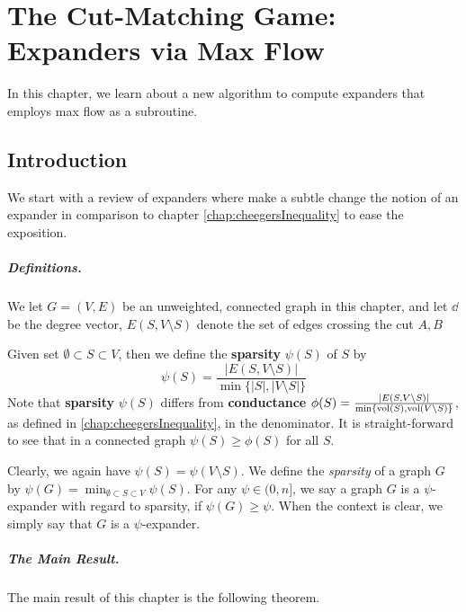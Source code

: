\chapter{The Cut-Matching Game: Expanders via Max Flow}

In this chapter, we learn about a new algorithm to compute expanders that employs max flow as a subroutine.

\section{Introduction}

We start with a review of expanders where make a subtle change the notion of an expander in comparison to chapter \ref{chap:cheegersInequality} to ease the exposition.

\paragraph{Definitions.} We let $G=(V,E)$ be an unweighted, connected graph in this chapter, and let $\dd$ be the degree vector, $E(S,V \setminus S)$ denote the set of edges crossing the cut $A,B$

Given set $\emptyset \subset S \subset V$, then we define the \textbf{sparsity} $\psi(S)$ of $S$ by
\[
\psi(S) = \frac{|E(S, V \setminus S)|}{ \min\{|S|, |V \setminus S| \} } 
\]
Note that \textbf{sparsity} $\psi(S)$ differs from \textbf{conductance} $\phi(S) = \frac{|E(S, V \setminus S)|}{ \min\{\operatorname{vol}(S), \operatorname{vol}(V \setminus S) \} }$, as defined in \ref{chap:cheegersInequality}, in the denominator. It is straight-forward to see that in a connected graph $\psi(S) \geq \phi(S)$ for all $S$. 

Clearly, we again have $\psi(S) = \psi(V \setminus S)$. We define the \emph{sparsity} of a graph $G$ by $\psi(G) = \min_{\emptyset \subset S \subset V} \psi(S)$. For any $\psi \in (0, n]$, we say a graph $G$ is a $\psi$-expander with regard to sparsity, if $\psi(G) \geq \psi$. When the context is clear, we simply say that $G$ is a $\psi$-expander. 

\paragraph{The Main Result.} The main result of this chapter is the following theorem.


